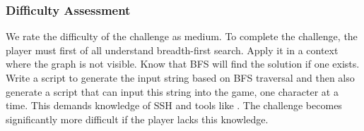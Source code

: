 

\subsubsection{Difficulty Assessment}


We rate the difficulty of the challenge as medium. To complete the challenge, the player must first of all understand breadth-first search. Apply it in a context where the graph is not visible. Know that BFS will find the solution if one exists. Write a script to generate the input string based on BFS traversal and then also generate a script that can input this string into the game, one character at a time. This demands knowledge of SSH and tools like . The challenge becomes significantly more difficult if the player lacks this knowledge.




